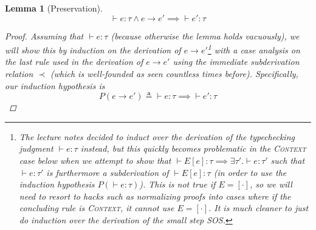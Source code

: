 \documentclass[11pt,a4paper]{article}
\newcommand{\Rec}[1]{\left\{#1\right\}}
\newcommand{\f}[1]{\textsc{#1}}
\newtheorem*{lemma}{Lemma}
\begin{document}
\begin{enumerate}[label=\textbf{Excercise \arabic*\ }]
\begin{enumerate}
\begin{enumerate}
\begin{lemma}[Preservation]
$$
\vdash e : \tau \wedge e \to e' \implies \vdash e':\tau
$$
\begin{proof}
Assuming that $\vdash e : \tau$ (because otherwise the lemma holds vacuously), we will show this by induction on the derivation of $e \to e'$\footnote{The lecture notes decided to induct over the derivation of the typechecking judgment $\vdash e:\tau$ instead, but this quickly becomes problematic in the \f{Context} case below when we attempt to show that $\vdash E[e]:\tau \implies \exists \tau'.\vdash e:\tau'$ such that $\vdash e:\tau'$ is furthermore a subderivation of $\vdash E[e]:\tau$ (in order to use the induction hypothesis $P(\vdash e : \tau)$). This is not true if $E = [\cdot]$, so we will need to resort to hacks such as normalizing proofs into cases where if the concluding rule is \f{Context}, it cannot use $E = [\cdot]$. It is much cleaner to just do induction over the derivation of the small step SOS.} with a case analysis on the last rule used in the derivation of $e \to e'$ using the immediate subderivation relation $\prec$ (which is well-founded as seen countless times before). Specifically, our induction hypothesis is
$$
P( e \to e') \triangleq \vdash e:\tau \implies  \vdash e':\tau
$$
\end{proof}
\end{lemma}
\end{enumerate}
\end{enumerate}
\end{enumerate}
\end{document}
